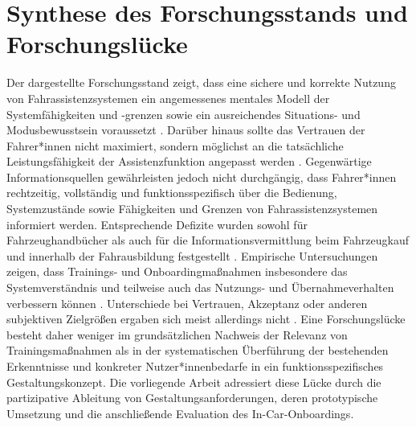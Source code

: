 \section{Synthese des Forschungsstands und Forschungslücke}
\label{sec:synthese_forschungsluecke}
Der dargestellte Forschungsstand zeigt, dass eine sichere und korrekte
Nutzung von Fahrassistenzsystemen ein angemessenes mentales Modell der
Systemfähigkeiten und -grenzen sowie ein ausreichendes Situations- und
Modusbewusstsein voraussetzt \cite{feinauer2023first,gaspar2020impact,kurpiers2020mode}. Darüber hinaus sollte das Vertrauen der Fahrer*innen nicht maximiert, sondern möglichst an die tatsächliche Leistungsfähigkeit der
Assistenzfunktion angepasst werden \cite{korber2018introduction,detjen2021supporting}. Gegenwärtige Informationsquellen gewährleisten jedoch nicht durchgängig, dass Fahrer*innen rechtzeitig, vollständig und funktionsspezifisch über die Bedienung, Systemzustände sowie Fähigkeiten
und Grenzen von Fahrassistenzsystemen informiert werden. Entsprechende
Defizite wurden sowohl für Fahrzeughandbücher als auch für die
Informationsvermittlung beim Fahrzeugkauf und innerhalb der Fahrausbildung festgestellt \cite{oviedo2021flick,manger2024explanation, mason2024developing,rodak2023driver}. Empirische Untersuchungen zeigen, dass Trainings- und
Onboardingmaßnahmen insbesondere das Systemverständnis und teilweise
auch das Nutzungs- und Übernahmeverhalten verbessern können \cite{forster2020and,feinauer2025impact,feinauer2023first,Boelhouwer2020,ebnali2020familiarization,murtaza2024assessing}. Unterschiede bei Vertrauen, Akzeptanz oder anderen subjektiven Zielgrößen ergaben sich meist allerdings nicht \cite{detjen2021supporting,forster2020and,feinauer2025impact}. Eine Forschungslücke besteht daher weniger im grundsätzlichen Nachweis der Relevanz von Trainingsmaßnahmen als in der systematischen Überführung der bestehenden Erkenntnisse und konkreter Nutzer*innenbedarfe in ein funktionsspezifisches Gestaltungskonzept. Die vorliegende Arbeit adressiert diese Lücke durch die partizipative Ableitung von Gestaltungsanforderungen, deren prototypische Umsetzung und die anschließende Evaluation des In-Car-Onboardings.